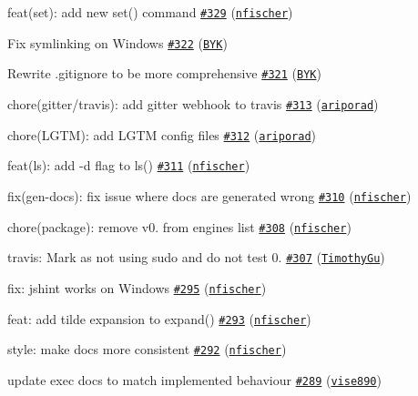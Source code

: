 \begin{DoxyItemize}
\item feat(set)\+: add new set() command \href{https://github.com/shelljs/shelljs/pull/329}{\tt \#329} (\href{https://github.com/nfischer}{\tt nfischer})
\item Fix symlinking on Windows \href{https://github.com/shelljs/shelljs/pull/322}{\tt \#322} (\href{https://github.com/BYK}{\tt B\+YK})
\item Rewrite .gitignore to be more comprehensive \href{https://github.com/shelljs/shelljs/pull/321}{\tt \#321} (\href{https://github.com/BYK}{\tt B\+YK})
\item chore(gitter/travis)\+: add gitter webhook to travis \href{https://github.com/shelljs/shelljs/pull/313}{\tt \#313} (\href{https://github.com/ariporad}{\tt ariporad})
\item chore(\+L\+G\+T\+M)\+: add L\+G\+TM config files \href{https://github.com/shelljs/shelljs/pull/312}{\tt \#312} (\href{https://github.com/ariporad}{\tt ariporad})
\item feat(ls)\+: add -\/d flag to ls() \href{https://github.com/shelljs/shelljs/pull/311}{\tt \#311} (\href{https://github.com/nfischer}{\tt nfischer})
\item fix(gen-\/docs)\+: fix issue where docs are generated wrong \href{https://github.com/shelljs/shelljs/pull/310}{\tt \#310} (\href{https://github.com/nfischer}{\tt nfischer})
\item chore(package)\+: remove v0. from engines list \href{https://github.com/shelljs/shelljs/pull/308}{\tt \#308} (\href{https://github.com/nfischer}{\tt nfischer})
\item travis\+: Mark as not using {\ttfamily sudo} and do not test 0. \href{https://github.com/shelljs/shelljs/pull/307}{\tt \#307} (\href{https://github.com/TimothyGu}{\tt Timothy\+Gu})
\item fix\+: jshint works on Windows \href{https://github.com/shelljs/shelljs/pull/295}{\tt \#295} (\href{https://github.com/nfischer}{\tt nfischer})
\item feat\+: add tilde expansion to expand() \href{https://github.com/shelljs/shelljs/pull/293}{\tt \#293} (\href{https://github.com/nfischer}{\tt nfischer})
\item style\+: make docs more consistent \href{https://github.com/shelljs/shelljs/pull/292}{\tt \#292} (\href{https://github.com/nfischer}{\tt nfischer})
\item update {\ttfamily exec} docs to match implemented behaviour \href{https://github.com/shelljs/shelljs/pull/289}{\tt \#289} (\href{https://github.com/vise890}{\tt vise890})

\end{DoxyItemize}
